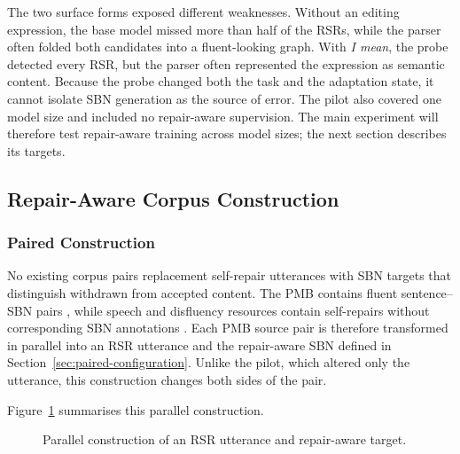 \documentclass{article}
\begin{document}
The two surface forms exposed different weaknesses. Without an editing expression,
the base model missed more than half of the RSRs, while the parser often folded
both candidates into a fluent-looking graph. With \textit{I mean}, the probe
detected every RSR, but the parser often represented the expression as semantic
content. Because the probe changed both the task and the adaptation state, it
cannot isolate SBN generation as the source of error. The pilot also covered
one model size and included no repair-aware supervision. The main experiment
will therefore test repair-aware training across model sizes; the next section
describes its targets.

\subsection{Repair-Aware Corpus Construction}
\label{sec:data}

\subsubsection{Paired Construction}

No existing corpus pairs replacement self-repair utterances with SBN targets
that distinguish withdrawn from accepted content. The PMB contains fluent
sentence--SBN pairs \citep{abzianidzeParallelMeaningBank2017}, while speech and
disfluency resources contain self-repairs without corresponding SBN annotations
\citep{deshmukhResegmentationSWITCHBOARD1998,
passaliLARDLargescaleArtificial2022,guptaDisflQABenchmarkDataset2021}. Each PMB
source pair is therefore transformed in parallel into an RSR utterance and the
repair-aware SBN defined in Section~\ref{sec:paired-configuration}. Unlike the
pilot, which altered only the utterance, this construction changes both sides
of the pair.

Figure~\ref{fig:paired-transformation} summarises this parallel construction.

\begin{figure}[ht]
\centering
{}
\caption{Parallel construction of an RSR utterance and repair-aware target.}
\label{fig:paired-transformation}
\end{figure}
\end{document}
